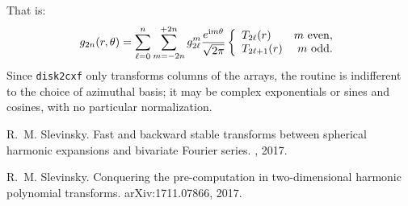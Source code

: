 \documentclass{article}
\def\ii{{\rm i}}
\begin{document}
That is:
\begin{equation}
g_{2n}(r,\theta) = \sum_{\ell=0}^{n}\sum_{m=-2n}^{+2n} g_{2\ell}^m \frac{e^{\ii m\theta}}{\sqrt{2\pi}} \left\{\begin{array}{lr} T_{2\ell}(r) & m~{\rm even},\\ T_{2\ell+1}(r) & m~{\rm odd}.\end{array}\right.
\end{equation}
Since {\tt disk2cxf} only transforms columns of the arrays, the routine is indifferent to the choice of azimuthal basis; it may be complex exponentials or sines and cosines, with no particular normalization.

\begin{thebibliography}{1}

R.~M. Slevinsky.
\newblock Fast and backward stable transforms between spherical harmonic
  expansions and bivariate {F}ourier series.
, 2017.

R.~M. Slevinsky.
\newblock Conquering the pre-computation in two-dimensional harmonic polynomial
  transforms.
\newblock arXiv:1711.07866, 2017.

\end{thebibliography}
\end{document}
